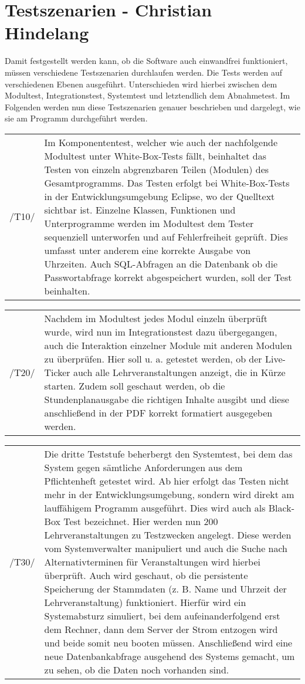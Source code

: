 \section{Testszenarien - Christian Hindelang}
\label{sec:Testszenarien}


Damit festgestellt werden kann, ob die Software auch einwandfrei funktioniert, müssen verschiedene Testszenarien durchlaufen werden.
Die Tests werden auf verschiedenen Ebenen ausgeführt. Unterschieden wird hierbei zwischen dem Modultest, Integrationstest, Systemtest und letztendlich dem Abnahmetest.
Im Folgenden werden nun diese Testszenarien genauer beschrieben und dargelegt, wie sie am Programm durchgeführt werden.

\begin{tabular}{p{1.5cm}p{14.5cm}}
 /T10/	& Im Komponententest, welcher wie auch der nachfolgende Modultest unter White-Box-Tests fällt, beinhaltet das Testen von einzeln abgrenzbaren Teilen (Modulen) des Gesamtprogramms. Das Testen erfolgt bei White-Box-Tests in der Entwicklungsumgebung Eclipse, wo der Quelltext sichtbar ist. Einzelne Klassen, Funktionen und Unterprogramme werden im Modultest dem Tester sequenziell unterworfen und auf Fehlerfreiheit geprüft. Dies umfasst unter anderem eine korrekte Ausgabe von Uhrzeiten. Auch SQL-Abfragen an die Datenbank ob die Passwortabfrage korrekt abgespeichert wurden, soll der Test beinhalten. \\[0.25cm]	 
\end{tabular}

\begin{tabular}{p{1.5cm}p{14.5cm}}
 /T20/	& Nachdem im Modultest jedes Modul einzeln überprüft wurde, wird nun im Integrationstest dazu übergegangen, auch die Interaktion einzelner Module mit anderen Modulen zu überprüfen.
Hier soll u. a. getestet werden, ob der Live-Ticker auch alle Lehrveranstaltungen anzeigt, die in Kürze starten. Zudem soll geschaut werden, ob die Stundenplanausgabe die richtigen Inhalte ausgibt und diese anschließend in der PDF korrekt formatiert ausgegeben werden. \\[0.25cm]	 
\end{tabular}

\begin{tabular}{p{1.5cm}p{14.5cm}}
 /T30/	& Die dritte Teststufe beherbergt den Systemtest, bei dem das System gegen sämtliche Anforderungen aus dem Pflichtenheft getestet wird. Ab hier erfolgt das Testen nicht mehr in der Entwicklungsumgebung, sondern wird direkt am lauffähigem Programm ausgeführt. Dies wird auch als Black-Box Test bezeichnet.
Hier werden nun 200 Lehrveranstaltungen zu Testzwecken angelegt. Diese werden vom Systemverwalter manipuliert und auch die Suche nach Alternativterminen für Veranstaltungen wird hierbei überprüft. Auch wird geschaut, ob die persistente Speicherung der Stammdaten
(z. B. Name und Uhrzeit der Lehrveranstaltung) funktioniert. Hierfür wird ein Systemabsturz simuliert, bei dem aufeinanderfolgend erst dem Rechner, dann dem Server der Strom entzogen wird und beide somit neu booten müssen. Anschließend wird eine neue Datenbankabfrage ausgehend des Systems gemacht, um zu sehen, ob die Daten noch vorhanden sind. \\[0.25cm]	 
\end{tabular}

